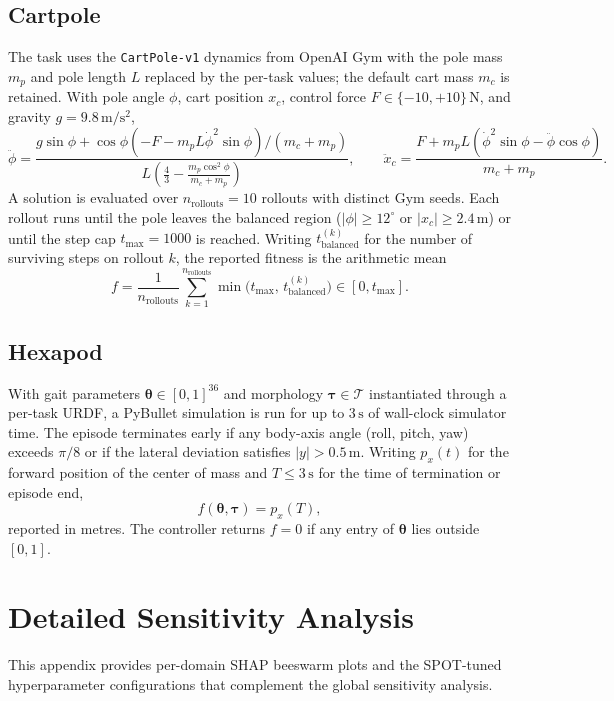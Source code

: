 \subsection{Cartpole}
The task uses the \texttt{CartPole-v1} dynamics from OpenAI Gym with the pole mass $m_p$ and pole length $L$ replaced by the per-task values; the default cart mass $m_c$ is retained. With pole angle $\phi$, cart position $x_c$, control force $F\in\{-10, +10\}\,\mathrm{N}$, and gravity $g=9.8\,\mathrm{m/s^2}$,
\[
\ddot{\phi} = \frac{g \sin \phi + \cos \phi \left(-F - m_p L \dot{\phi}^2 \sin \phi\right)/(m_c + m_p)}{L \left(\tfrac{4}{3} - \tfrac{m_p \cos^2 \phi}{m_c + m_p}\right)},
\qquad
\ddot{x}_c = \frac{F + m_p L \left(\dot{\phi}^2 \sin \phi - \ddot{\phi} \cos \phi\right)}{m_c + m_p}.
\]
A solution is evaluated over $n_{\text{rollouts}} = 10$ rollouts with distinct Gym seeds. Each rollout runs until the pole leaves the balanced region ($|\phi| \ge 12^\circ$ or $|x_c| \ge 2.4\,\mathrm{m}$) or until the step cap $t_{\max}=1000$ is reached. Writing $t_{\text{balanced}}^{(k)}$ for the number of surviving steps on rollout $k$, the reported fitness is the arithmetic mean
\[
f = \frac{1}{n_{\text{rollouts}}}\sum_{k=1}^{n_{\text{rollouts}}} \min\!\bigl(t_{\max},\, t_{\text{balanced}}^{(k)}\bigr) \in [0, t_{\max}].
\]

\subsection{Hexapod}
With gait parameters $\boldsymbol{\theta}\in[0,1]^{36}$ and morphology $\boldsymbol{\tau}\in\mathcal{T}$ instantiated through a per-task URDF, a PyBullet simulation is run for up to $3\,\mathrm{s}$ of wall-clock simulator time. The episode terminates early if any body-axis angle (roll, pitch, yaw) exceeds $\pi/8$ or if the lateral deviation satisfies $|y|>0.5\,\mathrm{m}$. Writing $p_x(t)$ for the forward position of the center of mass and $T\le 3\,\mathrm{s}$ for the time of termination or episode end,
\[
f(\boldsymbol{\theta},\boldsymbol{\tau}) = p_x(T),
\]
reported in metres. The controller returns $f=0$ if any entry of $\boldsymbol{\theta}$ lies outside $[0,1]$.


\section{Detailed Sensitivity Analysis}\label{app:sensitivity}

This appendix provides per-domain SHAP beeswarm plots and the SPOT-tuned hyperparameter configurations that complement the global sensitivity analysis.

